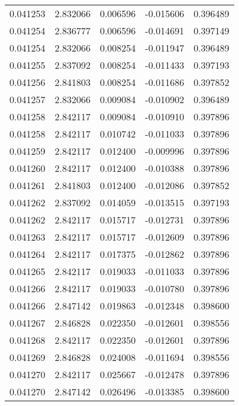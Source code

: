 \begin{tabular}{lrrrr}
0.041253    &  2.832066 &  0.006596 & -0.015606 &             0.396489 \\
0.041254    &  2.836777 &  0.006596 & -0.014691 &             0.397149 \\
0.041254    &  2.832066 &  0.008254 & -0.011947 &             0.396489 \\
0.041255    &  2.837092 &  0.008254 & -0.011433 &             0.397193 \\
0.041256    &  2.841803 &  0.008254 & -0.011686 &             0.397852 \\
0.041257    &  2.832066 &  0.009084 & -0.010902 &             0.396489 \\
0.041258    &  2.842117 &  0.009084 & -0.010910 &             0.397896 \\
0.041258    &  2.842117 &  0.010742 & -0.011033 &             0.397896 \\
0.041259    &  2.842117 &  0.012400 & -0.009996 &             0.397896 \\
0.041260    &  2.842117 &  0.012400 & -0.010388 &             0.397896 \\
0.041261    &  2.841803 &  0.012400 & -0.012086 &             0.397852 \\
0.041262    &  2.837092 &  0.014059 & -0.013515 &             0.397193 \\
0.041262    &  2.842117 &  0.015717 & -0.012731 &             0.397896 \\
0.041263    &  2.842117 &  0.015717 & -0.012609 &             0.397896 \\
0.041264    &  2.842117 &  0.017375 & -0.012862 &             0.397896 \\
0.041265    &  2.842117 &  0.019033 & -0.011033 &             0.397896 \\
0.041266    &  2.842117 &  0.019033 & -0.010780 &             0.397896 \\
0.041266    &  2.847142 &  0.019863 & -0.012348 &             0.398600 \\
0.041267    &  2.846828 &  0.022350 & -0.012601 &             0.398556 \\
0.041268    &  2.842117 &  0.022350 & -0.012601 &             0.397896 \\
0.041269    &  2.846828 &  0.024008 & -0.011694 &             0.398556 \\
0.041270    &  2.842117 &  0.025667 & -0.012478 &             0.397896 \\
0.041270    &  2.847142 &  0.026496 & -0.013385 &             0.398600 \\

\end{tabular}
